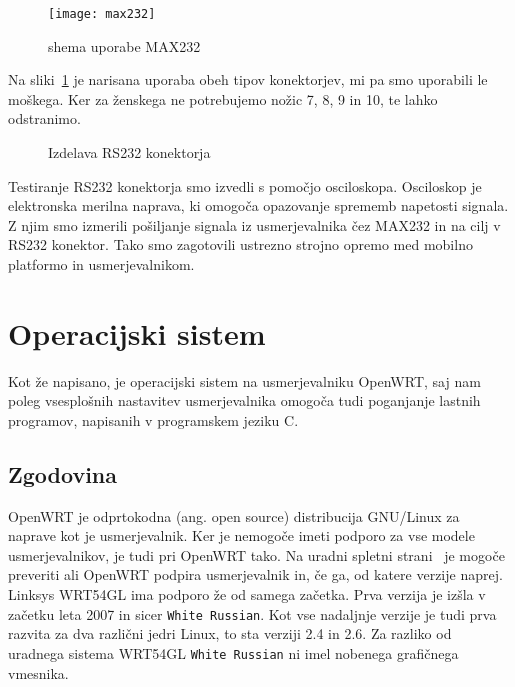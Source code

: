 \documentclass[a4paper, 12pt]{book}
\begin{document}
\begin{figure}[h]
	\centering
	\texttt{[image: max232]}
	\caption{shema uporabe MAX232~\cite{bibJbproject}}
	\label{picMAX232}
\end{figure}

Na sliki~\ref{picMAX232} je narisana uporaba obeh tipov konektorjev, mi pa smo uporabili le moškega. Ker za ženskega ne potrebujemo nožic 7, 8, 9 in 10, te lahko odstranimo. 

\begin{figure}[h]
	\centering
	\subfloat[JP2]{\label{picRS232_no1}\texttt{[image: RS232\_no1]}} \hfill
	\subfloat[MAX232 + RS232]{\label{picRS232_no2}\texttt{[image: RS232\_no2]}} \hfill
	\subfloat[skupaj]{\label{picRS232_no3}\texttt{[image: RS232\_no3]}} \hfill
	\caption{Izdelava RS232 konektorja}
	\label{picRS232}
\end{figure}

Testiranje RS232 konektorja smo izvedli s pomočjo osciloskopa. Osciloskop je elektronska merilna naprava, ki omogoča opazovanje sprememb napetosti signala. Z njim smo izmerili pošiljanje signala iz usmerjevalnika čez MAX232 in na cilj v RS232 konektor. Tako smo zagotovili ustrezno strojno opremo med mobilno platformo in usmerjevalnikom. 

\section{Operacijski sistem}
\label{sec:OpenWRT}
Kot že napisano, je operacijski sistem na usmerjevalniku OpenWRT, saj nam poleg vsesplošnih nastavitev usmerjevalnika omogoča tudi poganjanje lastnih programov, napisanih v programskem jeziku C. 
\subsection{Zgodovina}
OpenWRT je odprtokodna (ang. open source) distribucija GNU/Linux za naprave kot je usmerjevalnik. Ker je nemogoče imeti podporo za vse modele usmerjevalnikov, je tudi pri OpenWRT tako. Na uradni spletni strani~\cite{bibOpenWRT} je mogoče preveriti ali OpenWRT podpira usmerjevalnik in, če ga, od katere verzije naprej. Linksys WRT54GL ima podporo že od samega začetka. Prva verzija je izšla v začetku leta 2007 in sicer {\tt White Russian}. Kot vse nadaljnje verzije je tudi prva razvita za dva različni jedri Linux, to sta verziji 2.4 in 2.6. Za razliko od uradnega sistema WRT54GL {\tt White Russian} ni imel nobenega grafičnega vmesnika.
\end{document}
